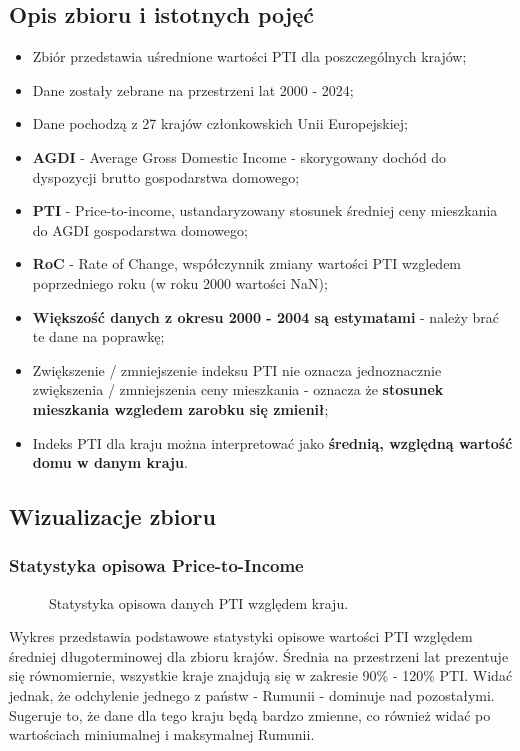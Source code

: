 \documentclass[12pt]{article}
\begin{document}
\subsection{Opis zbioru i istotnych pojęć}
\begin{itemize}
    \item Zbiór przedstawia uśrednione wartości PTI dla poszczególnych krajów;
    \item Dane zostały zebrane na przestrzeni lat 2000 - 2024;
    \item Dane pochodzą z 27 krajów członkowskich Unii Europejskiej;
    \item \textbf{AGDI} - Average Gross Domestic Income - skorygowany dochód do dyspozycji brutto gospodarstwa domowego;
    \item \textbf{PTI} - Price-to-income, ustandaryzowany stosunek średniej ceny mieszkania do AGDI gospodarstwa domowego;
    \item \textbf{RoC} - Rate of Change, współczynnik zmiany wartości PTI wzgledem poprzedniego roku (w roku 2000 wartości NaN);
    \item \textbf{Większość danych z okresu 2000 - 2004 są estymatami} - należy brać te dane na poprawkę;
    \item Zwiększenie / zmniejszenie indeksu PTI nie oznacza jednoznacznie zwiększenia / zmniejszenia ceny mieszkania 
    - oznacza że \textbf{stosunek mieszkania wzgledem zarobku się zmienił};
    \item Indeks PTI dla kraju można interpretować jako \textbf{średnią, względną wartość domu w danym kraju}.
\end{itemize}


\subsection{Wizualizacje zbioru}
\subsubsection{Statystyka opisowa Price-to-Income}
\begin{figure}[H]
    
    \caption{Statystyka opisowa danych PTI względem kraju.}
\end{figure}

Wykres przedstawia podstawowe statystyki opisowe wartości PTI względem średniej długoterminowej dla zbioru krajów. 
Średnia na przestrzeni lat prezentuje się równomiernie, wszystkie kraje znajdują się w zakresie 90\% - 120\% PTI.
Widać jednak, że odchylenie jednego z państw - Rumunii - dominuje nad pozostałymi. Sugeruje to, że dane dla tego 
kraju będą bardzo zmienne, co również widać po wartościach miniumalnej i maksymalnej Rumunii.
\end{document}

